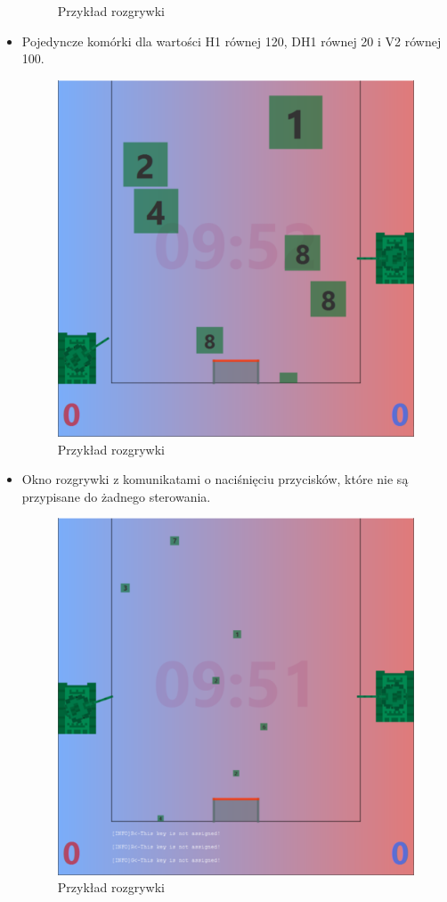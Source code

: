 \documentclass[11pt,a4paper]{report}
\begin{document}
\begin{itemize}
\begin{figure}[!ht]
\caption{ Przykład rozgrywki }
\end{figure}
\newpage
\item{}Pojedyncze komórki dla wartości H1 równej 120, DH1 równej 20 i V2 równej 100.
\begin{figure}[!ht]
\centerline{\includegraphics{img/rozgrywka5.png}}
\caption{ Przykład rozgrywki }
\end{figure}
\newpage
\item{}Okno rozgrywki z komunikatami o naciśnięciu przycisków, które nie są przypisane do żadnego sterowania.
\begin{figure}[!ht]
\centerline{\includegraphics{img/rozgrywka6.png}}
\caption{ Przykład rozgrywki }
\end{figure}
\end{itemize}
\newpage
\end{document}
